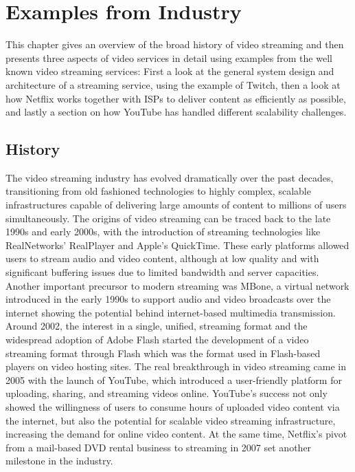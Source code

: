 \chapter{Examples from Industry}\label{chapter:examples}

This chapter gives an overview of the broad history of video streaming and then presents three aspects of video services in detail using examples from the well known video streaming services: First a look at the general system design and architecture of a streaming service, using the example of Twitch, then a look at how Netflix works together with \ac{ISPs} to deliver content as efficiently as possible, and lastly a section on how YouTube has handled different scalability challenges.     

\section{History}
The video streaming industry has evolved dramatically over the past decades, transitioning from old fashioned technologies to highly complex, scalable infrastructures capable of delivering large amounts of content to millions of users simultaneously. The origins of video streaming can be traced back to the late 1990s and early 2000s, with the introduction of streaming technologies like RealNetworks' RealPlayer and Apple's QuickTime. These early platforms allowed users to stream audio and video content, although at low quality and with significant buffering issues due to limited bandwidth and server capacities.
Another important precursor to modern streaming was \ac{MBone}, a virtual network introduced in the early 1990s to support audio and video broadcasts over the internet showing the potential behind internet-based multimedia transmission. 
Around 2002, the interest in a single, unified, streaming format and the widespread adoption of Adobe Flash started the development of a video streaming format through Flash which was the format used in Flash-based players on video hosting sites.
The real breakthrough in video streaming came in 2005 with the launch of YouTube, which introduced a user-friendly platform for uploading, sharing, and streaming videos online. YouTube's success not only showed the willingness of users to consume hours of uploaded video content via the internet, but also the potential for scalable video streaming infrastructure, increasing the demand for online video content. At the same time, Netflix's pivot from a mail-based DVD rental business to streaming in 2007 set another milestone in the industry. 

